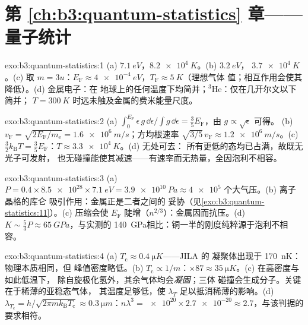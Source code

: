 \section*{第 \ref{ch:b3:quantum-statistics} 章——量子统计}

\begin{solution}{exo:b3:quantum-statistics:1}
(a) $\qty{7.1}{eV}$，$\qty{8.2e4}{K}$。(b) $\qty{3.2}{eV}$，
$\qty{3.7e4}{K}$。(c) 取 $m = 3u$：$E_{\text{F}} \approx
\qty{4e-4}{eV}$，$T_{\text{F}} \approx \qty{5}{K}$（理想气体
值；相互作用会使其降低）。(d) 金属电子：在
地球上的任何温度下均简并；$^3$He：仅在几开尔文以下简并；
$T = \qty{300}{K}$ 时远未触及金属的费米能量尺度。
\end{solution}

\begin{solution}{exo:b3:quantum-statistics:2}
(a) $\int_0^{E_{\text{F}}}\epsilon\,g\,\dd\epsilon/\int g\,\dd
\epsilon = \tfrac35 E_{\text{F}}$，由 $g \propto \sqrt\epsilon$ 可得。
(b) $v_{\text{F}} = \sqrt{2E_{\text{F}}/m_{\text{e}}} =
\qty{1.6e6}{m/s}$；方均根速率 $\sqrt{3/5}\,v_{\text{F}} \approx
\qty{1.2e6}{m/s}$。(c) $\tfrac32 k_{\text{B}}T = \tfrac35
E_{\text{F}}$：$T \approx \qty{3.3e4}{K}$。(d) 无处可去：
所有更低的态均已占满，故既无光子可发射，
也无碰撞能使其减速——有速率而无热量，全因泡利不相容。
\end{solution}

\begin{solution}{exo:b3:quantum-statistics:3}
(a) $P = 0.4 \times \num{8.5e28} \times \qty{7.1}{eV} =
\qty{3.9e10}{Pa} \approx \num{4e5}$ 个大气压。(b) 离子晶格的库仑
吸引作用：金属正是二者之间的
妥协（见\cref{exo:b3:quantum-statistics:11}）。(c) 压缩会使
$E_{\text{F}}$ 陡增（$n^{2/3}$）：金属因而抗压。(d) $K \sim
\tfrac53 P \approx \qty{65}{GPa}$，与实测的
\qty{140}{GPa}相比：铜一半的刚度纯粹源于泡利不相容。
\end{solution}

\begin{solution}{exo:b3:quantum-statistics:4}
(a) $T_{\text{c}} \approx \qty{0.4}{\micro K}$——JILA 的
凝聚体出现于 \qty{170}{nK}：物理本质相同，但
峰值密度略低。(b) $T_{\text{c}} \propto 1/m$：$\times87 \approx
\qty{35}{\micro K}$。(c) 在高密度与如此低温下，
除自旋极化氢外，其余气体均会\emph{凝固}；三体
碰撞会生成分子。关键在于稀薄的亚稳态气体，
其温度足够低，使 $\lambda_T$ 足以抵消稀薄的影响。(d)
$\lambda_{T_{\text{c}}} = h/\sqrt{2\pi mk_{\text{B}}T_{\text{c}}}
\approx \qty{0.3}{\micro m}$：$n\lambda^3 = \num{e20} \times
\num{2.7e-20} \approx 2.7$，与该判据的要求相符。
\end{solution}

